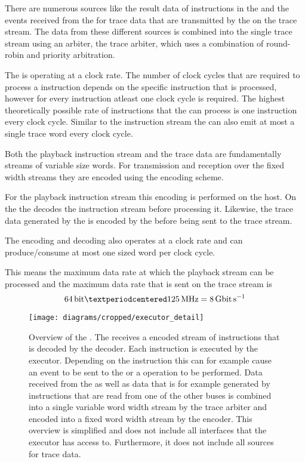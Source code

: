 There are numerous sources like the result data of instructions in the \readCat{} and the events received from the \ASIC{} for trace data that are transmitted by the \pbexec{} on the trace stream. The data from these different sources is combined into the single trace stream using an arbiter, the trace arbiter, which uses a combination of round-robin and priority arbitration.

The \pbexec{} is operating at a \pbExecClock{} clock rate. The number of clock cycles that are required to process a instruction depends on the specific instruction that is processed, however for every instruction atleast one clock cycle is required. The highest theoretically possible rate of instructions that the \pbexec{} can process is one instruction every clock cycle. Similar to the instruction stream the \pbexec{} can also emit at most a single trace word every clock cycle.

Both the playback instruction stream and the trace data are fundamentally streams of variable size words. For transmission and reception over the fixed width \HostARQ{} streams they are encoded using the \UT{} encoding scheme\autocite{karasenko2020neumann}.

For the playback instruction stream this encoding is performed on the host. On the \FPGA{} the \pbexec{} decodes the instruction stream before processing it.
Likewise, the trace data generated by the \pbexec{} is encoded by the \pbexec{} before being sent to the trace stream.

The encoding and decoding also operates at a \pbExecClock{} clock rate and can produce/consume at most one \PhyWordSize{} sized word per clock cycle.

This means the maximum data rate at which the playback stream can be processed and the maximum data rate that is sent on the trace stream is
\[\PhyWordSize{} · \pbExecClock{} = \pbExecBandwidth{}\]

\begin{figure}
\centerline{\texttt{[image: diagrams/cropped/executor\_detail]}}
\caption{Overview of the \pbexec{}. The \pbexec{} receives a \UT{} encoded stream of instructions that is decoded by the \UT{} decoder. Each instruction is executed by the executor. Depending on the instruction this can for example cause an event to be sent to the \ASIC{} or a \JTAG{} operation to be performed. Data received from the \ASIC{} as well as data that is for example generated by instructions that are read from one of the other \FPGA{} buses is combined into a single variable word width stream by the trace arbiter and encoded into a fixed word width stream by the \UT{} encoder.
This overview is simplified and does not include all interfaces that the executor has access to. Furthermore, it does not include all sources for trace data.}\label{diagram:executor}
\end{figure}

